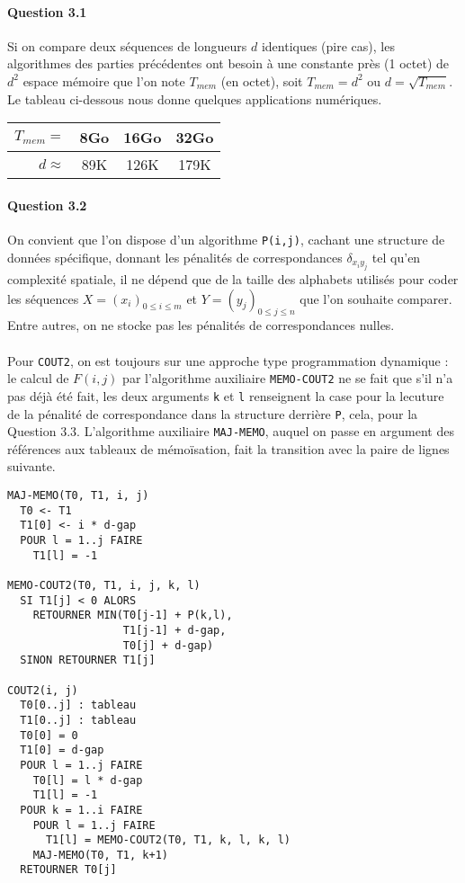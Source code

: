 \paragraph{Question 3.1}
Si on compare deux s\'equences de longueurs $d$ identiques (pire cas),
les algorithmes des parties pr\'ec\'edentes ont besoin \`a une
constante pr\`es (1 octet) de $d^2$ espace m\'emoire que l'on note
$T_{mem}$ (en octet), soit $T_{mem}=d^2$ ou $d=\sqrt{T_{mem}}$. Le tableau
ci-dessous nous donne quelques applications num\'eriques.
\begin{table*}[h]
  \centering
  \begin{tabular}{rc|c|c}
    $T_{mem}=$&8Go&16Go&32Go\\
    \hline
    $d\approx$&89K&126K&179K
  \end{tabular}
\end{table*}

\paragraph{Question 3.2}
On convient que l'on dispose d'un algorithme \verb'P(i,j)', cachant
une structure de donn\'ees sp\'ecifique, donnant les p\'enalit\'es de
correspondances $\delta_{x_iy_j}$ tel qu'en complexit\'e spatiale, il
ne d\'epend que de la taille des alphabets utilis\'es pour coder les
s\'equences $X=(x_i)_{0\leq i\leq m}$ et $Y=(y_j)_{0\leq j\leq n}$ que
l'on souhaite comparer. Entre autres, on ne stocke pas les
p\'enalit\'es de correspondances nulles.
\\\\

Pour \verb'COUT2', on est toujours sur une approche type programmation
dynamique : le calcul de $F(i,j)$ par l'algorithme auxiliaire
\verb'MEMO-COUT2' ne se fait que s'il n'a pas d\'ej\`a \'et\'e fait,
les deux arguments \verb'k' et \verb'l' renseignent la case pour la
lecuture de la p\'enalit\'e de correspondance dans la structure
derri\`ere \verb'P', cela, pour la Question 3.3.  L'algorithme
auxiliaire \verb'MAJ-MEMO', auquel on passe en argument des
r\'ef\'erences aux tableaux de m\'emo\"isation, fait la transition
avec la paire de lignes suivante.
\begin{verbatim}
MAJ-MEMO(T0, T1, i, j)
  T0 <- T1
  T1[0] <- i * d-gap
  POUR l = 1..j FAIRE
    T1[l] = -1

MEMO-COUT2(T0, T1, i, j, k, l)
  SI T1[j] < 0 ALORS
    RETOURNER MIN(T0[j-1] + P(k,l),
                  T1[j-1] + d-gap,
                  T0[j] + d-gap)
  SINON RETOURNER T1[j]

COUT2(i, j)
  T0[0..j] : tableau
  T1[0..j] : tableau
  T0[0] = 0
  T1[0] = d-gap
  POUR l = 1..j FAIRE
    T0[l] = l * d-gap
    T1[l] = -1
  POUR k = 1..i FAIRE
    POUR l = 1..j FAIRE
      T1[l] = MEMO-COUT2(T0, T1, k, l, k, l)
    MAJ-MEMO(T0, T1, k+1)
  RETOURNER T0[j]
\end{verbatim}
\pagebreak

